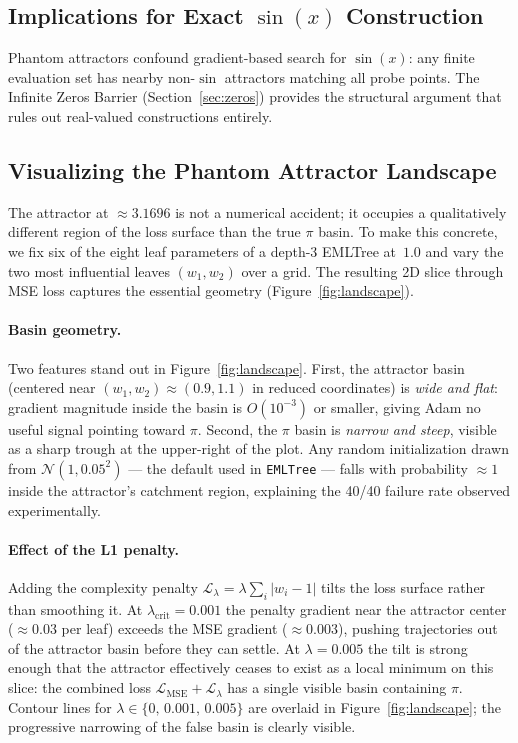 \documentclass[11pt,a4paper]{article}
\begin{document}
\subsection{Implications for Exact $\sin(x)$ Construction}

Phantom attractors confound gradient-based search for $\sin(x)$:
any finite evaluation set has nearby non-$\sin$ attractors matching
all probe points.
The Infinite Zeros Barrier (Section~\ref{sec:zeros}) provides the
structural argument that rules out real-valued constructions entirely.

\subsection{Visualizing the Phantom Attractor Landscape}
\label{sec:attractor_landscape}

The attractor at $\approx3.1696$ is not a numerical accident;
it occupies a qualitatively different region of the loss surface
than the true $\pi$ basin.
To make this concrete, we fix six of the eight leaf parameters of a
depth-3 EMLTree at~$1.0$ and vary the two most influential leaves
$(w_1, w_2)$ over a grid.
The resulting 2D slice through MSE loss captures the essential geometry
(Figure~\ref{fig:landscape}).

\paragraph{Basin geometry.}
Two features stand out in Figure~\ref{fig:landscape}.
First, the attractor basin (centered near $(w_1,w_2)\approx(0.9,1.1)$
in reduced coordinates) is \emph{wide and flat}: gradient magnitude
inside the basin is $O(10^{-3})$ or smaller, giving Adam no useful
signal pointing toward $\pi$.
Second, the $\pi$ basin is \emph{narrow and steep}, visible as a
sharp trough at the upper-right of the plot.
Any random initialization drawn from $\mathcal{N}(1,0.05^2)$ --- the
default used in \texttt{EMLTree} --- falls with probability $\approx1$
inside the attractor's catchment region, explaining the 40/40 failure
rate observed experimentally.

\paragraph{Effect of the L1 penalty.}
Adding the complexity penalty
$\mathcal{L}_\lambda = \lambda \sum_i |w_i - 1|$
tilts the loss surface rather than smoothing it.
At $\lambda_{\text{crit}}=0.001$ the penalty gradient near the
attractor center ($\approx\!0.03$ per leaf) exceeds the MSE gradient
($\approx\!0.003$), pushing trajectories out of the attractor basin
before they can settle.
At $\lambda=0.005$ the tilt is strong enough that the attractor
effectively ceases to exist as a local minimum on this slice:
the combined loss $\mathcal{L}_{\text{MSE}}+\mathcal{L}_\lambda$
has a single visible basin containing $\pi$.
Contour lines for $\lambda\in\{0,\,0.001,\,0.005\}$ are overlaid in
Figure~\ref{fig:landscape}; the progressive narrowing of the false
basin is clearly visible.
\end{document}
